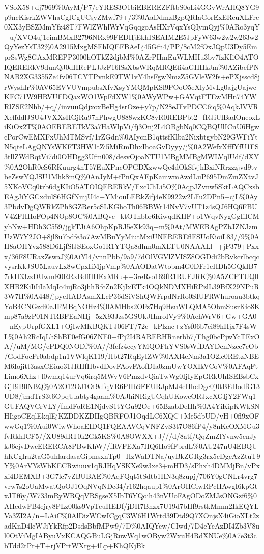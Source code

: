 \documentclass[]{article}
\begin{document}
VSoX58+dj7969\%0AyM/P7/eYRES3O1biEBEREZFftbS0oLi4GGvWrAHQ8YG9p9ncKisrkZWVhaCgICgUCsyZMwf79+/3\%0AaDdmzBgpQRIaGorExERcuXLFrc0XX3yBSZMmYfz48T7FWlZWhlWrVqGqqgoAsHXrVqxYsQIymQyj\%0ARo3yqY+u/XVO4uj1eimBMxB2796NRx99FEDHjEkhISEAIM2E5JpFyW63w2w2w263w2QyYezYsT32\%0A2915MxgMSEhIQEFBAeLj45Gfn4/PP/8cM2fOxJQpU3Dy5EmprSsWg8GAxMREPP3000hOTkZ2djbM\%0AZrPHmEuWLMHu3bv7fzKIiO4ATOIQERERkV9dunQJ0dHRePLJJzF16lSsXbsWRqMRQEfi4aGHHkJm\%0AZibefPNNAB2XG3355Ze4fv06TCYTPvnkE9TW1vY4hsFgwNmzZ5GVleW2fs+ePXjsscd8jrWyshIr\%0AV65EVVUVmpubsXfvXsyYMQMpKSl9POoO5eXlyMvLg0ajgUajwcKFC71W9HRVUFDQaxWO1WpFdXW1\%0AWyWPw+GAVqtFTEwMHn74YWRlZSE2Nhb/+q//invuuQdjxoxBeHg4srOze+y7p/N28eJFvPDCC6iq\%0AqkJVVRXeffddlJSU4JVXXsHGjRu97nPhwgU888wzKC8vR0REBPbt2+fRJiUlBadOneoxLiKiOx2T\%0AOERERETkV3a7HaWlpVi/fj3Onj2L4OBgbNq0CQBQUlICnU6HgwcPorCwEMXFxUhMTMSvf/1rZGdn\%0AIycnB1qttsfKlba2NixbtgybN29GWFiYtN5qteLAgQNYsWKFT3HW1tZi5MiRmDhxIhoaGvDyyy/j\%0A2WefxXfffYfU1FS3tllZWdBqtVi7di0OHDgg3Ufm008/desvOjoaNTU1MBgMMBgMWLVqlUdf/dXY\%0A2OhR0eS6RKuurg4nT57EuXPncOPGDXzwwQe4dOkSfvjhBxiNRrzzzjvd9tvbeZswYQJSU1Mhk8mQ\%0AnJyM+fPnQxAEpKamwmAwdLuP695DmZmZXtvJ5XKoVCq0trb6dgKIiO5ATOIQERERkV/FxcUhLi5O\%0AqpJZvnw5SktLAQCxsbEAgJiYGCxdulS6HGfNmjU4c+YMiouLERkZifj4eK9922w2LFu2DPn5+cjL\%0Ay3PbdvDgQWRkZPh8GZRer5cSLKGhoTh06BBWr14NvV7vUT1z4sQJ6HQ6FBUV4ZFHHoFOp4NOp8OC\%0ABQvc+ktOTnbbr6KiwqdKHF+o1WqvNygGgIiICMybNw+HDh3C559/jgkTJiA6OhpKpRJ5eXk93q+m\%0At/MWEBAgPZbJZNJzmUzW7Y2JO+8jl8u7bdfe3o7AwMBuYyMiutMxiUNEREREflFSUoKioiL83//9\%0AH8aOHYvz588D6LjfSlJSEoxGo1R1YTQa8dlnn0mXLTU0NAAALl++jP379+Pxxx/36F8URaxZswaJ\%0AiYl4/vnnPbb/9a9/7dOlVGVlZVISZ8OGDdi2bRvkcrlbcqcvysrKkJSU5LauvLx8wCpxIiMjpVmp\%0AAODatWtobm4G0DFr1eHDh5GQkIB77rkH33zzDUwmE0RRxBdffIHExMRu++3reRso169fR1RUFJRK\%0A5ZCPTUQ0XHB2KiIiIiIaMqIo4ujRo3jhhRfcZn2KjIxETk4OQkNDMXHiRPzlL39BfX29NPuR3W7H\%0A448/jpycHADAsmXLcP36dSiVShQWFrpdNrRo0SIUFRWhuroau3btkqYoB4CNGzdi0aJFMBqNOHz4\%0AMHbs2OFz7Hq9HsuWLQMA5ObmSusrKio8Kmp87a9zP01NTRBFEaNHj+5zX93Jzs5GSUkJHnroIVy9\%0AehWrV6+Gw+GA0+nEypUrpfGXL1+OjIwMKBQKTJ06FT/72c+kPlznc+zYsf06b7ei89hHjx7F4sWL\%0Ah2RcIqLhShBF0efG06ZNE0+fPj2I4RARERHRnerbb7/Fhg0bcPjwYcTExOA//uM/MG/ePDQ0NODf\%0A//3fcfz4ccyYMQOFhYVS0sWfDAYDcnNzce7cOb/GodFocPr0abdp1n1VWlqK119/Hbt27RqEyIZW\%0AXl4eNm3a1O2lc0REtzNBEM6Iojitt3asxCEiuo31JRHfHbvdDovFAovFAofDIa0zmUwYOXIkVCoV\%0AFAqFtLimo6Xhz+l0wmq14urVq6irq5MWvV6PmzdvQiaTwWg0IjIyEpGRkUhISEBsbCxGjBiB0NBQ\%0A2O12OJ1Ot9dfqVR6PHb9FEURJpMJ4eHhcDgc0j0tBEHodfG13UD8/jmdTrS3t6OpqUlabty4gaam\%0AJhiNRigUCqhUKowcORJxcXGIjY2FWq1GUFAQVCrVLY/fmdFoRE1NjdvS1tYGu92Oe+65BzabDeHh\%0A4YiKipKWkSNHIigoCEqlEkqlEjKZDDKZDIIgQBRFOJ1OqdLC6XQC+Me5dbUD/vH+0fl9xOFwwGq1\%0Aui0WiwWhoaEIDQ1FQEAAVCqVNFZvS3t7O86fP4/y8nKcOXMGu3fvRkhICF5//XU89dRT0k2Gk5KS\%0A8OWXX+J///d/8atf/QqZmZlYvnw5cnJykJ6ejvDwcERERCA8PBwKhW//fRVFEXa7HQ6Ho9fFbrdL\%0AU247nU4EBQUhKCgIra2taG5uhlardasaGipmsxnTp0+HzWaDTNa/uyBkZGRg3rx5cDgcAzZtuT9Y\%0ArVYsWbKECRwiuuv1qRJHqVSKXe9w3xe3+mHD3/sPhxh4DMMjBn/vPxxi4DEMXB+3G7lc7vZBUBAE\%0AqFQqt5tSdtb1HN3q8zupj/706Y0gCNLr4vrg7vrw7s2oUaMwatQoOJ1OqNVqNDc34/r162hqaup1\%0ArOHClwRPcHAwgI6kpGtxJTf6y/W733mRyWRQqVRSgseX5IbT6YQoih43nVUoFAgODoZMJsONGzf6\%0AHedwFB4ejry8PLz00ks9VpTcuHEDf/jDH7Bnzx7U19d7bHf9rstkMmm2IkEQYLVa3ZI2A/n+LAiC\%0AlDizWCwICgqC3W6H1Wrtd39Dtd9Q7XOnjsX4iGioXLt2zadKnD4lcWJiYkRfp2DsdsBbfMPw9/7D\%0AIQYew/CIwd/7D4cYeAzDI4Zb3V8ul0OtViMgIAByuVxKCAQGBuLGjRuwWq1wOByw2WxuH4RdXNUe\%0A7e3t3cbTdd2tPr+T+rjVPrtWXrg+4Lp+KhQKjBk
\end{document}
